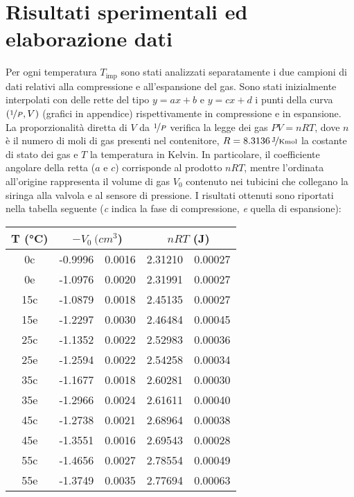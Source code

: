 \documentclass[italian,a4paper]{article}
\newcommand{\mol}{mol}
\begin{document}
\section{Risultati sperimentali ed elaborazione dati}
Per ogni temperatura $T_{\text{imp}}$ sono stati analizzati separatamente i due campioni di dati relativi alla compressione e all'espansione del gas.
Sono stati inizialmente interpolati con delle rette del tipo $y=ax+b$ e $y=cx+d$ i punti della curva $(\nicefrac{1}{P},V)$ (grafici in appendice) rispettivamente in compressione e in espansione. La proporzionalità diretta di $V$ da $\nicefrac{1}{P}$ verifica la legge dei gas $PV=nRT$, dove $n$ è il numero di moli di gas presenti nel contenitore, $R=\unitfrac[8.3136]{J}{K\mol}$ la costante di stato dei gas e $T$ la temperatura in Kelvin. In particolare, il coefficiente angolare della retta ($a$ e $c$) corrisponde al prodotto $nRT$, mentre l'ordinata all'origine rappresenta il volume di gas $V_0$ contenuto nei tubicini che collegano la siringa alla valvola e al sensore di pressione. I risultati ottenuti sono riportati nella tabella seguente (\emph{c} indica la fase di compressione, \emph{e} quella di espansione):
\begin{table}[h]
\centering
 \begin{tabular}{c r@{$\pm$}l r@{$\pm$}l}
 T (\unit{\celsius}) &  \multicolumn{2}{c}{$-V_0\ (\unit{cm^3}$)}  & \multicolumn{2}{c}{$nRT$ (\unit{J})}\\\hline
   0c & -0.9996 &  0.0016 &  2.31210 &  0.00027\\
   0e & -1.0976 &  0.0020 &  2.31991 &  0.00027\\
  15c & -1.0879 &  0.0018 &  2.45135 &  0.00027\\
  15e & -1.2297 &  0.0030 &  2.46484 &  0.00045\\
  25c & -1.1352 &  0.0022 &  2.52983 &  0.00036\\
  25e & -1.2594 &  0.0022 &  2.54258 &  0.00034\\
  35c & -1.1677 &  0.0018 &  2.60281 &  0.00030\\
  35e & -1.2966 &  0.0024 &  2.61611 &  0.00040\\
  45c & -1.2738 &  0.0021 &  2.68964 &  0.00038\\
  45e & -1.3551 &  0.0016 &  2.69543 &  0.00028\\
  55c & -1.4656 &  0.0027 &  2.78554 &  0.00049\\
  55e & -1.3749 &  0.0035 &  2.77694 &  0.00063\\
 \end{tabular}
\end{table}\\
\end{document}
